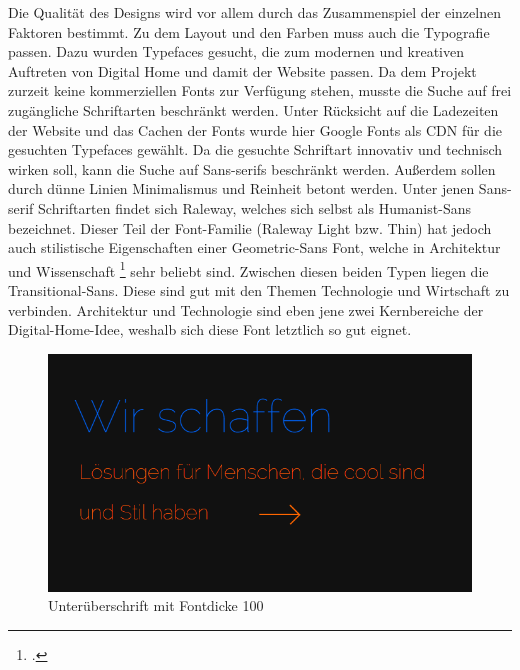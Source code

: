 Die Qualität des Designs wird vor allem durch das Zusammenspiel der einzelnen Faktoren bestimmt. Zu dem Layout und den Farben muss auch die Typografie passen. Dazu wurden Typefaces gesucht, die zum modernen und kreativen Auftreten von Digital Home und damit der Website passen. Da dem Projekt zurzeit keine kommerziellen Fonts zur Verfügung stehen, musste die Suche auf frei zugängliche Schriftarten beschränkt werden. Unter Rücksicht auf die Ladezeiten der Website und das Cachen der Fonts wurde hier Google Fonts als CDN für die gesuchten Typefaces gewählt.
Da die gesuchte Schriftart innovativ und technisch wirken soll, kann die Suche auf Sans-serifs beschränkt werden. Außerdem sollen durch dünne Linien Minimalismus und Reinheit betont werden. Unter jenen Sans-serif Schriftarten findet sich Raleway, welches sich selbst als Humanist-Sans bezeichnet. Dieser Teil der Font-Familie (Raleway Light bzw. Thin) hat jedoch auch stilistische Eigenschaften einer Geometric-Sans Font, welche in Architektur und Wissenschaft \footcite[vgl.][]{codeschool:typo} sehr beliebt sind. Zwischen diesen beiden Typen liegen die Transitional-Sans. Diese sind gut mit den Themen Technologie und Wirtschaft zu verbinden. Architektur und Technologie sind eben jene zwei Kernbereiche der Digital-Home-Idee, weshalb sich diese Font letztlich so gut eignet.
        \begin{figure} [htp]
\includegraphics[width=\textwidth]{./img/inno_typo1.png}
\caption{Unterüberschrift mit Fontdicke 100}
\label{inno_Typo1}
\end{figure}


